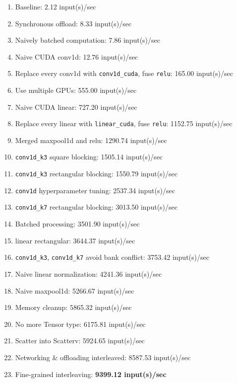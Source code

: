 \begin{enumerate}
    \item Baseline: 2.12 input(s)/sec
    \item Synchronous offload: 8.33 input(s)/sec
    \item Naively batched computation: 7.86 input(s)/sec
    \item Naive CUDA conv1d: 12.76 input(s)/sec
    \item Replace every conv1d with \texttt{conv1d\_cuda}, fuse \texttt{relu}: 165.00 input(s)/sec
    \item Use multiple GPUs: 555.00 input(s)/sec
    \item Naive CUDA linear: 727.20 input(s)/sec
    \item Replace every linear with \texttt{linear\_cuda}, fuse \texttt{relu}: 1152.75 input(s)/sec
    \item Merged maxpool1d and relu: 1290.74 input(s)/sec
    \item \texttt{conv1d\_k3} square blocking: 1505.14 input(s)/sec
    \item \texttt{conv1d\_k3} rectangular blocking: 1550.79 input(s)/sec
    \item \texttt{conv1d} hyperparameter tuning: 2537.34 input(s)/sec
    \item \texttt{conv1d\_k7} rectangular blocking: 3013.50 input(s)/sec
    \item Batched processing: 3501.90 input(s)/sec
    \item linear rectangular: 3644.37 input(s)/sec
    \item \texttt{conv1d\_k3}, \texttt{conv1d\_k7} avoid bank conflict: 3753.42 input(s)/sec
    \item Naive linear normalization: 4241.36 input(s)/sec
    \item Naive maxpool1d: 5266.67 input(s)/sec
    \item Memory cleanup: 5865.32 input(s)/sec
    \item No more Tensor type: 6175.81 input(s)/sec
    \item Scatter into Scatterv: 5924.65 input(s)/sec
    \item Networking \& offloading interleaved: 8587.53 input(s)/sec
    \item Fine-grained interleaving: \textbf{9399.12 input(s)/sec}
\end{enumerate}

